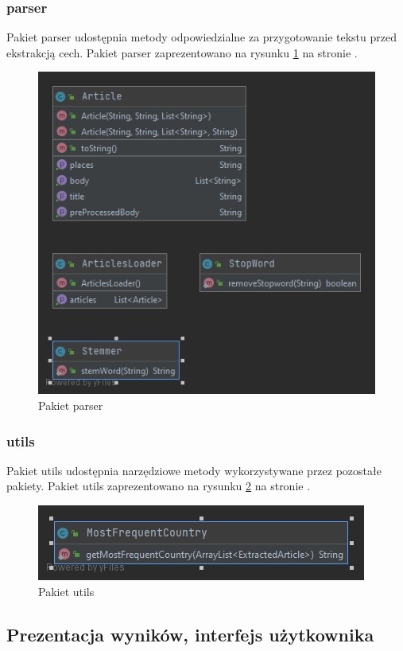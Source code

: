 \documentclass{classrep}
\begin{document}
\subsubsection{parser}
Pakiet parser udostępnia metody odpowiedzialne za przygotowanie tekstu przed ekstrakcją cech. Pakiet parser zaprezentowano na rysunku \ref{prs} na stronie \pageref{prs}.

\begin{figure}
\label{prs}
\includegraphics[scale=0.5]{Package parser}
\caption{Pakiet parser}
\end{figure}


\subsubsection{utils}
Pakiet utils udostępnia narzędziowe metody wykorzystywane przez pozostałe pakiety.  Pakiet utils zaprezentowano na rysunku \ref{utls} na stronie \pageref{utls}.
\begin{figure}
\label{utls}
\includegraphics[scale=0.5]{Package utils}
\caption{Pakiet utils}
\end{figure}

\subsection{Prezentacja wyników, interfejs użytkownika} 
\end{document}
